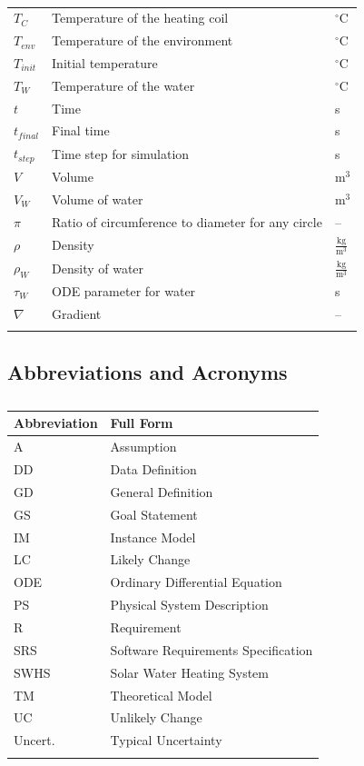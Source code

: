 \documentclass[12pt]{article}
\begin{document}
\begin{longtabu}{l X[l] l}
\\
${T_{C}}$ & Temperature of the heating coil & ${}^{\circ}$C
\\
${T_{env}}$ & Temperature of the environment & ${}^{\circ}$C
\\
${T_{init}}$ & Initial temperature & ${}^{\circ}$C
\\
${T_{W}}$ & Temperature of the water & ${}^{\circ}$C
\\
$t$ & Time & s
\\
${t_{final}}$ & Final time & s
\\
${t_{step}}$ & Time step for simulation & s
\\
$V$ & Volume & $\text{m}^{3}$
\\
${V_{W}}$ & Volume of water & $\text{m}^{3}$
\\
$π$ & Ratio of circumference to diameter for any circle & --
\\
$ρ$ & Density & $\frac{\text{kg}}{\text{m}^{3}}$
\\
${ρ_{W}}$ & Density of water & $\frac{\text{kg}}{\text{m}^{3}}$
\\
${τ_{W}}$ & ODE parameter for water & s
\\
$∇$ & Gradient & --
\\
\bottomrule
\caption{}
\label{Table:ToS}
\end{longtabu}
\subsection{Abbreviations and Acronyms}
\label{Sec:TAbbAcc}
\begin{longtable}{l l}
\toprule
\textbf{Abbreviation} & \textbf{Full Form}
\\
\midrule
\endhead
A & Assumption
\\
DD & Data Definition
\\
GD & General Definition
\\
GS & Goal Statement
\\
IM & Instance Model
\\
LC & Likely Change
\\
ODE & Ordinary Differential Equation
\\
PS & Physical System Description
\\
R & Requirement
\\
SRS & Software Requirements Specification
\\
SWHS & Solar Water Heating System
\\
TM & Theoretical Model
\\
UC & Unlikely Change
\\
Uncert. & Typical Uncertainty
\\
\bottomrule
\caption{}
\label{Table:TAbbAcc}
\end{longtable}
\end{document}
